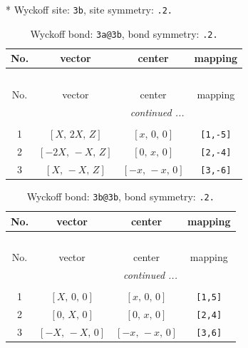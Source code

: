 \documentclass[fleqn,8pt]{jsarticle}
\begin{document}
* Wyckoff site: {\tt 3b}, site symmetry: {\tt .2.}
\renewcommand{\arraystretch}{1.2}
\begin{longtable}{cccc}
\caption{Wyckoff bond: {\tt 3a@3b}, bond symmetry: {\tt .2.}}
 \\
 \hline \hline
No. & vector & center & mapping \\ \hline \endfirsthead

\multicolumn{3}{l}{\tablename\ \thetable{}} \\
 \hline \hline
No. & vector & center & mapping \\ \hline \endhead

 \hline \hline
\multicolumn{3}{r}{\footnotesize\it continued ...} \\ \endfoot

 \hline \hline
\multicolumn{3}{r}{} \\ \endlastfoot

1 & $\left[ X,\, 2 X,\, Z \right]$ & $\left[ x,\, 0,\, 0 \right]$ & {\tt [1,-5]} \\ \hline
2 & $\left[ - 2 X,\, - X,\, Z \right]$ & $\left[ 0,\, x,\, 0 \right]$ & {\tt [2,-4]} \\ \hline
3 & $\left[ X,\, - X,\, Z \right]$ & $\left[ - x,\, - x,\, 0 \right]$ & {\tt [3,-6]} \\
\end{longtable}
\renewcommand{\arraystretch}{1.2}
\begin{longtable}{cccc}
\caption{Wyckoff bond: {\tt 3b@3b}, bond symmetry: {\tt .2.}}
 \\
 \hline \hline
No. & vector & center & mapping \\ \hline \endfirsthead

\multicolumn{3}{l}{\tablename\ \thetable{}} \\
 \hline \hline
No. & vector & center & mapping \\ \hline \endhead

 \hline \hline
\multicolumn{3}{r}{\footnotesize\it continued ...} \\ \endfoot

 \hline \hline
\multicolumn{3}{r}{} \\ \endlastfoot

1 & $\left[ X,\, 0,\, 0 \right]$ & $\left[ x,\, 0,\, 0 \right]$ & {\tt [1,5]} \\ \hline
2 & $\left[ 0,\, X,\, 0 \right]$ & $\left[ 0,\, x,\, 0 \right]$ & {\tt [2,4]} \\ \hline
3 & $\left[ - X,\, - X,\, 0 \right]$ & $\left[ - x,\, - x,\, 0 \right]$ & {\tt [3,6]} \\
\end{longtable}
\end{document}
